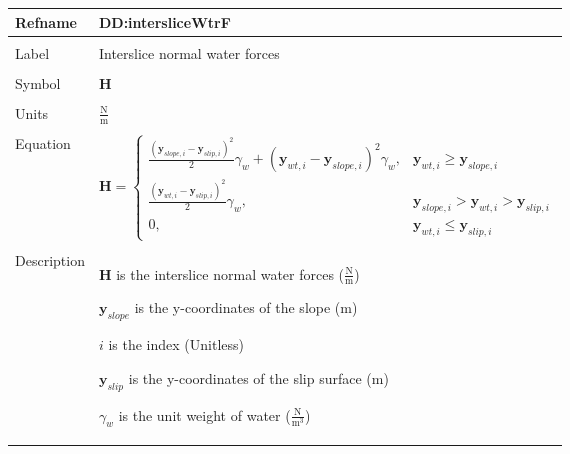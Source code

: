\documentclass[12pt]{article}
\begin{document}
\noindent \begin{minipage}{\textwidth}
          \begin{tabular}{>{\raggedright}p{}>{\raggedright\arraybackslash}p{}}
          \toprule \textbf{Refname} & \textbf{DD:intersliceWtrF}
          \label{DD:intersliceWtrF}
          \\ \midrule \\
          Label & Interslice normal water forces
          \\ \midrule \\
          Symbol & $\mathbf{H}$
          \\ \midrule \\
          Units & $\frac{\text{N}}{\text{m}}$
          \\ \midrule \\
          Equation & \begin{displaymath}
                     \mathbf{H}=\begin{cases}
                                \frac{\left({\mathbf{y}_{slope,i}}-{\mathbf{y}_{slip,i}}\right)^{2}}{2} {γ_{w}}+\left({\mathbf{y}_{wt,i}}-{\mathbf{y}_{slope,i}}\right)^{2} {γ_{w}}, & {\mathbf{y}_{wt,i}}\geq{}{\mathbf{y}_{slope,i}}\\
\frac{\left({\mathbf{y}_{wt,i}}-{\mathbf{y}_{slip,i}}\right)^{2}}{2} {γ_{w}}, & {\mathbf{y}_{slope,i}}>{\mathbf{y}_{wt,i}}>{\mathbf{y}_{slip,i}}\\
0, & {\mathbf{y}_{wt,i}}\leq{}{\mathbf{y}_{slip,i}}
                                \end{cases}
                     \end{displaymath}
          \\ \midrule \\
          Description & \begin{symbDescription}
                        \item{$\mathbf{H}$ is the interslice normal water forces ($\frac{\text{N}}{\text{m}}$)}
                        \item{${\mathbf{y}_{slope}}$ is the y-coordinates of the slope (m)}
                        \item{$i$ is the index (Unitless)}
                        \item{${\mathbf{y}_{slip}}$ is the y-coordinates of the slip surface (m)}
                        \item{${γ_{w}}$ is the unit weight of water ($\frac{\text{N}}{\text{m}^{3}}$)}

\end{symbDescription}
\end{tabular}
\end{minipage}
\end{document}
